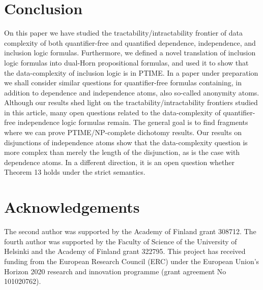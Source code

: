 \documentclass{article}
\theoremstyle{plain}
\theoremstyle{definition}
\begin{document}
\section{Conclusion}
On this paper we have studied the  tractability/intractability frontier  of data complexity of both quantifier-free and quantified  dependence, independence, and inclusion logic formulas. Furthermore, we defined a novel translation of  inclusion logic formulas into dual-Horn propositional formulas, and used it to show that the data-complexity of inclusion logic is in PTIME. In a paper under preparation we shall consider similar questions for quantifier-free formulas containing, in addition to dependence and independence atoms, also so-called anonymity atoms.
Although our results shed light on the tractability/intractability frontiers studied in this article, many open  questions related to the data-complexity of quantifier-free independence logic formulas remain. The general goal is to find fragments where we can prove PTIME/NP-complete dichotomy results. Our results on disjunctions of independence atoms show that the data-complexity question is more complex than merely the length of the disjunction, as is the case with dependence atoms. In a different direction,  it is an open question whether Theorem 13 holds under the strict semantics. 


\section*{Acknowledgements}
The second author was supported by the Academy of Finland grant 308712. The fourth author was supported by the Faculty of Science of the University of Helsinki and the Academy of Finland grant 322795. This project has received funding from the European Research Council (ERC) under the European Union’s Horizon 2020 research and innovation programme (grant agreement No 101020762).


\end{document}
